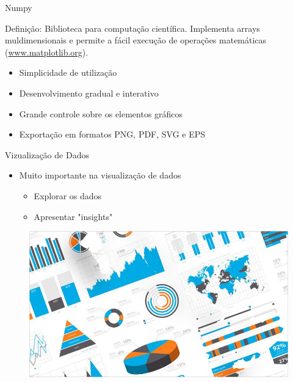 \begin{frame}[t, fragile]{Numpy}
  \begin{block}{Definição:}
    Biblioteca para computação científica. Implementa arrays muldimensionais e permite a fácil execução de operações matemáticas  (\url{www.matplotlib.org}). 
  \end{block}
  \begin{itemize}
    \item Simplicidade de utilização
    \item Desenvolvimento gradual e interativo
    \item Grande controle sobre os elementos gráficos
    \item Exportação em formatos PNG, PDF, SVG e EPS 
  \end{itemize}
\end{frame}
%
\begin{frame}[t, fragile]{Vizualização de Dados}
  \begin{itemize}
    \item Muito importante na visualização de dados
    \begin{itemize}
      \item Explorar os dados
      \item Apresentar "insights"
    \end{itemize}
  \end{itemize}
  \begin{figure}
    \includegraphics[scale=.30]{aula-2/figuras/matplot-dataviz-a.jpg}
  \end{figure}
\end{frame}
%

 